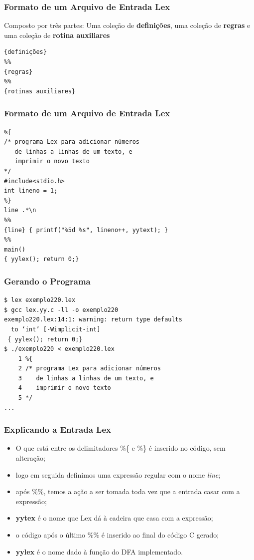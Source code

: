 \documentclass[table]{beamer}
\begin{document}
\begin{frame}[fragile]
   \frametitle{Formato de um Arquivo de Entrada Lex}
   \begin{block}{Composto por três partes:}
   Uma coleção de \textbf{definições}, uma coleção de \textbf{regras} e uma coleção de \textbf{rotina auxiliares}
   \end{block}
   \begin{verbatim}
{definições}
%%
{regras}
%%
{rotinas auxiliares}
   \end{verbatim}
\end{frame}

\begin{frame}[fragile]
   \frametitle{Formato de um Arquivo de Entrada Lex}
   \begin{verbatim}
%{
/* programa Lex para adicionar números
   de linhas a linhas de um texto, e 
   imprimir o novo texto
*/
#include<stdio.h>
int lineno = 1;
%}
line .*\n
%%
{line} { printf("%5d %s", lineno++, yytext); }
%% 
main()
{ yylex(); return 0;}
   \end{verbatim}
\end{frame}

\begin{frame}[fragile]
   \frametitle{Gerando o Programa}
   \begin{verbatim}
$ lex exemplo220.lex 
$ gcc lex.yy.c -ll -o exemplo220
exemplo220.lex:14:1: warning: return type defaults 
  to ‘int’ [-Wimplicit-int]
 { yylex(); return 0;}
$ ./exemplo220 < exemplo220.lex 
    1 %{
    2 /* programa Lex para adicionar números
    3    de linhas a linhas de um texto, e 
    4    imprimir o novo texto
    5 */
...
   \end{verbatim}
\end{frame}

\begin{frame}
   \frametitle{Explicando a Entrada Lex}
   \begin{itemize}
      \item O que está entre os delimitadores \%\{ e \%\} é inserido no código, sem alteração;
      \item logo em seguida definimos uma expressão regular com o nome \textit{line};
      \item após \%\%, temos a ação a ser tomada toda vez que a entrada casar com a expressão;
      \item \textbf{yytex} é o nome que Lex dá à cadeira que casa com a expressão;
      \item o código após o último \%\% é inserido ao final do código C gerado;
      \item \textbf{yylex} é o nome dado à função do DFA implementado.
   \end{itemize}
\end{frame}
\end{document}
